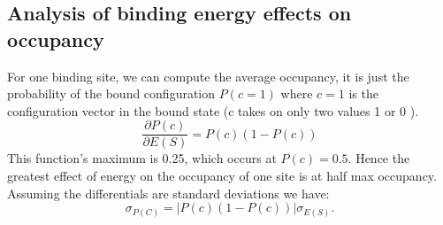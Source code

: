 \subsection{Analysis of binding energy effects on occupancy}
For one binding site, we can compute the average occupancy, it is just the probability of the bound configuration $P(c=1)$ where $c=1$ is the configuration vector in the bound state (c takes on only two values 1 or 0 ).
\begin{equation}
\frac{\partial{P(c)}}{\partial{E(S)}} =  P(c)(1-P(c))
\end{equation}
This function's maximum is 0.25, which occurs at $P(c)=0.5$.  Hence the greatest effect of energy on the occupancy of one site is at half max occupancy. 
Assuming the differentials are standard deviations we have:
\begin{equation}
 \sigma_{P(C)}=|P(c)(1-P(c))| \sigma_{E(S)}.
  \end{equation}  

